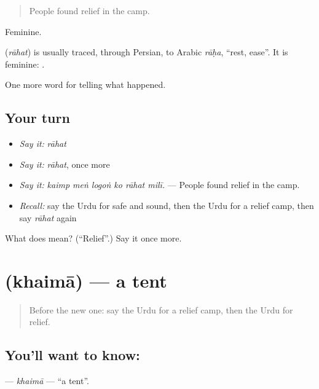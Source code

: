 \begin{quote}
People found relief in the camp.
\end{quote}

Feminine.

\begin{cousinweb}
\textbf{} (\emph{rāhat}) is usually traced, through Persian, to Arabic \emph{rāḥa}, \textquotedblleft{}rest, ease\textquotedblright{}. It is feminine: \textbf{ }.
\end{cousinweb}

\begin{grammarlens}[title={What you've built}]
One more word for telling what happened.
\end{grammarlens}

\subsection*{Your turn}
\begin{itemize}
\raggedright
  \item \emph{Say it:} \emph{rāhat}
  \item \emph{Say it:} \emph{rāhat}, once more
  \item \emph{Say it:} \emph{kaimp meṅ logoṅ ko rāhat milī.} — People found relief in the camp.
  \item \emph{Recall:} say the Urdu for safe and sound, then the Urdu for a relief camp, then say \emph{rāhat} again
\end{itemize}

\begin{tcolorbox}[breakable,colback=teal!4,colframe=teal!35!black,title={Before you move on}]
What does  mean? (\textquotedblleft{}Relief\textquotedblright{}.) Say it once more.
\end{tcolorbox}
\section[\texorpdfstring{\ur{خیمہ} (khaimā)}{خیمہ (khaimā)}]{ (khaimā) — a tent}

\label{lesson:UR-C297-khaima}



\begin{quote}
Before the new one: say the Urdu for a relief camp, then the Urdu for relief.
\end{quote}

\subsection*{You'll want to know: }
\textbf{} — \emph{khaimā} — \textquotedblleft{}a tent\textquotedblright{}.

